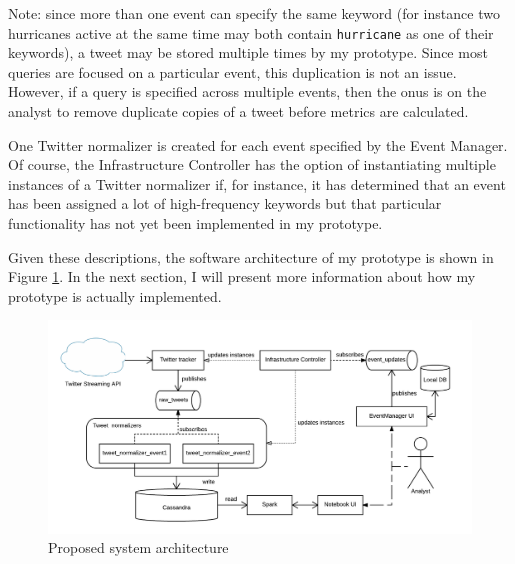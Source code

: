 \begin{itemize}
  Note: since more than one event can specify the same keyword (for instance two hurricanes active at the same time may both contain \texttt{hurricane} as one of their keywords), a tweet may be stored multiple times by my prototype. Since most queries are focused on a particular event, this duplication is not an issue. However, if a query is specified across multiple events, then the onus is on the analyst to remove duplicate copies of a tweet before metrics are calculated.

  One Twitter normalizer is created for each event specified by the Event Manager. Of course, the Infrastructure Controller has the option of instantiating multiple instances of a Twitter normalizer if, for instance, it has determined that an event has been assigned a lot of high-frequency keywords but that particular functionality has not yet been implemented in my prototype.
\end{itemize}

Given these descriptions, the software architecture of my prototype is shown in Figure \ref{fig:SysArch}. In the next section, I will present more information about how my prototype is actually implemented.

\begin{figure}
\centering
\includegraphics[width=\textwidth]{Figures/SysArch2}
\decoRule
\caption[System architecture]{Proposed system architecture}
\label{fig:SysArch}
\end{figure}
